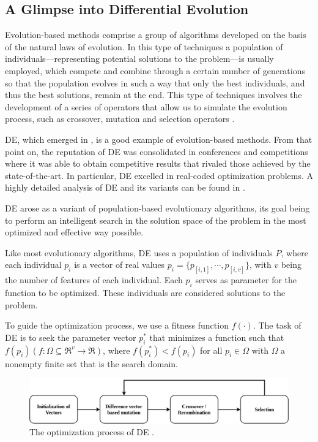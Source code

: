 \subsection{A Glimpse into Differential Evolution}

Evolution-based methods comprise a group of algorithms developed on the basis of the natural laws of evolution. In this type of techniques a population of individuals---representing potential solutions to the problem---is usually employed, which compete and combine through a certain number of generations so that the population evolves in such a way that only the best individuals, and thus the best solutions, remain at the end. This type of techniques involves the development of a series of operators that allow us to simulate the evolution process, such as crossover, mutation and selection operators \cite{fausto2019ants}. 

\acf{DE}, which emerged in \cite{storn1997differential}, is a good example of evolution-based methods. From that point on, the reputation of \acs{DE} was consolidated in conferences and competitions where it was able to obtain competitive results that rivaled those achieved by the state-of-the-art. In particular, \acs{DE} excelled in real-coded optimization problems. A highly detailed analysis of \acs{DE} and its variants can be found in \cite{das2011differential}.

\acs{DE} arose as a variant of population-based evolutionary algorithms, its goal being to perform an intelligent search in the solution space of the problem in the most optimized and effective way possible.

Like most evolutionary algorithms, \acs{DE} uses a population of individuals $P$, where each individual $p_i$ is a vector of real values $p_i = \{p_{[i,1]},\cdots,p_{[i,v]}\}$, with $v$ being the number of features of each individual. Each $p_i$ serves as parameter for the function to be optimized. These individuals are considered solutions to the problem.

To guide the optimization process, we use a fitness function $f(\cdot)$. The task of \acs{DE} is to seek the parameter vector $p_i^*$ that minimizes a function such that $f(p_i)(f: \Omega \subseteq \mathfrak{R}^{v} \rightarrow \mathfrak{R})$, where $f(p_i^*) < f(p_i)$ for all $p_i \in \Omega$ with $\Omega$ a nonempty finite set that is the search domain.

\begin{figure}[!h]
	\centering
	\includegraphics[scale=0.3]{gfx/NewProp/SHADE/DEop.png}
	\caption[The optimization process of \acs{DE}.]{The optimization process of \acs{DE} \cite{das2011differential}.}\label{fig:DE}
\end{figure}

